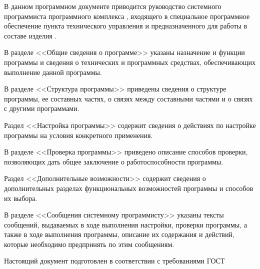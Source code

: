 \newpage\annotation

В данном программном документе приводится руководство системного программиста программного комплекса \programname, входящего в специальное программное обеспечение пункта технического управления и предназначенного для работы в составе изделия \productname.

В разделе <<Общие сведения о программе>> указаны назначение и функции программы и сведения о технических и программных средствах, обеспечивающих выполнение данной программы.

В разделе <<Структура программы>> приведены сведения о структуре программы, ее составных частях, о связях между составными частями и о связях с другими программами.

Раздел <<Настройка программы>> содержит сведения о действиях по настройке программы на условия конкретного применения.

В разделе <<Проверка программы>> приведено описание способов проверки, позволяющих дать общее заключение о работоспособности программы.

Раздел <<Дополнительные возможности>> содержит сведения о дополнительных разделах функциональных возможностей программы и способов их
выбора.

В разделе <<Сообщения системному программисту>> указаны тексты сообщений, выдаваемых в ходе выполнения настройки, проверки программы, а также в ходе выполнения программы, описание их содержания и действий, которые необходимо предпринять по этим сообщениям.

Настоящий документ подготовлен в соответствии с требованиями ГОСТ~\cite{gost19503}
